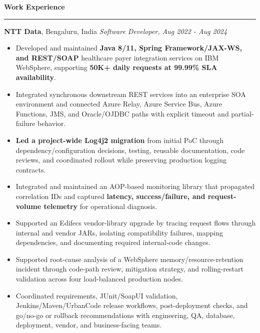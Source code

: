 \documentclass[11pt,letterpaper]{article}
\newcommand{\ressection}[1]{\Needspace{6\baselineskip}\vspace{8pt}\par\textbf{#1}\par\vspace{2pt}\hrule\vspace{5pt}}
\begin{document}
\ressection{Work Experience}
\textbf{NTT Data}, Bengaluru, India \hfill \textit{Software Developer, Aug 2022 - Aug 2024}
\begin{itemize}
  \item Developed and maintained \textbf{Java 8/11, Spring Framework/JAX-WS, and REST/SOAP} healthcare payer integration services on IBM WebSphere, supporting \textbf{50K+ daily requests at 99.99\% SLA availability}.
  \item Integrated synchronous downstream REST services into an enterprise SOA environment and connected Azure Relay, Azure Service Bus, Azure Functions, JMS, and Oracle/OJDBC paths with explicit timeout and partial-failure behavior.
  \item \textbf{Led a project-wide Log4j2 migration} from initial PoC through dependency/configuration decisions, testing, reusable documentation, code reviews, and coordinated rollout while preserving production logging contracts.
  \item Integrated and maintained an AOP-based monitoring library that propagated correlation IDs and captured \textbf{latency, success/failure, and request-volume telemetry} for operational diagnosis.
  \item Supported an Edifecs vendor-library upgrade by tracing request flows through internal and vendor JARs, isolating compatibility failures, mapping dependencies, and documenting required internal-code changes.
  \item Supported root-cause analysis of a WebSphere memory/resource-retention incident through code-path review, mitigation strategy, and rolling-restart validation across four load-balanced production nodes.
  \item Coordinated requirements, JUnit/SoapUI validation, Jenkins/Maven/UrbanCode release workflows, post-deployment checks, and go/no-go or rollback recommendations with engineering, QA, database, deployment, vendor, and business-facing teams.
\end{itemize}
\end{document}
